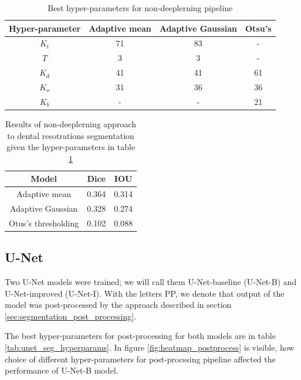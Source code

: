 \begin{table}[H]
    \begin{tabular}{|c|c|c|c|}
        \hline
        Hyper-parameter & Adaptive mean & Adaptive Gaussian & Otsu's \\ \hline
        $K_t$           & 71            & 83                & -      \\ \hline
        $T$             & 3             & 3                 & -      \\ \hline
        $K_d$           & 41            & 41                & 61     \\ \hline
        $K_o$           & 31            & 36                & 36     \\ \hline
        $K_b$           & -             & -                 & 21     \\ \hline
    \end{tabular}
    \caption{Best hyper-parameters for non-deeplerning pipeline}
    \label{tab:nondl_restorations:best_params}
\end{table}


\begin{table}[H]
    \centering
    \begin{tabular}{|c|c|c|}
        \hline
        Model               & Dice  & IOU   \\ \hline
        Adaptive mean       & 0.364 & 0.314 \\ \hline
        Adaptive Gaussian   & 0.328 & 0.274 \\ \hline
        Otus's thresholding & 0.102 & 0.088 \\ \hline
    \end{tabular}
    \caption{Results of non-deeplerning approach to dental resotrations segmentation given the hyper-parameters in table \ref{tab:nondl_restorations:best_params}}
    \label{tab:nondl_results}
\end{table}



\subsection{U-Net}
Two U-Net models were trained; we will call them U-Net-baseline (U-Net-B) and U-Net-improved (U-Net-I). With the letters PP, we denote that output of the model was post-processed by the approach described in section \ref{sec:segmentation_post_processing}.

The best hyper-parameters for post-processing for both models are in table \ref{tab:unet_seg_hyperparams}. In figure \ref{fig:heatmap_postprocess} is visible, how choice of different hyper-parameters for post-procssing pipeline affected the performance of U-Net-B model.

